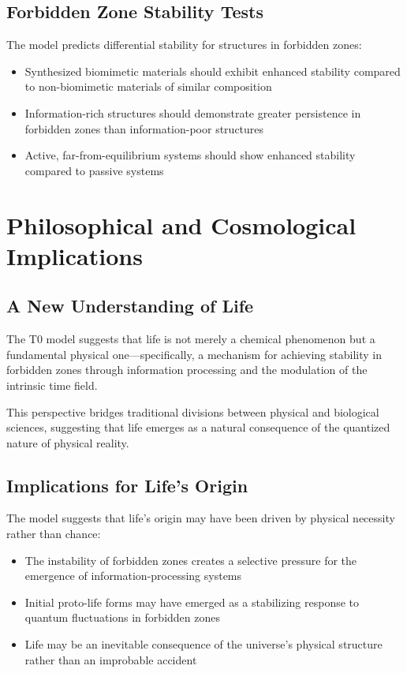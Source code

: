 \documentclass[12pt,a4paper]{article}
\begin{document}
	\subsection{Forbidden Zone Stability Tests}
	\label{subsec:forbidden_zone_tests}
	
	The model predicts differential stability for structures in forbidden zones:
	
	\begin{itemize}
		\item Synthesized biomimetic materials should exhibit enhanced stability compared to non-biomimetic materials of similar composition
		\item Information-rich structures should demonstrate greater persistence in forbidden zones than information-poor structures
		\item Active, far-from-equilibrium systems should show enhanced stability compared to passive systems
	\end{itemize}
	
	\section{Philosophical and Cosmological Implications}
	\label{sec:philosophical_implications}
	
	\subsection{A New Understanding of Life}
	\label{subsec:new_understanding}
	
	The T0 model suggests that life is not merely a chemical phenomenon but a fundamental physical one—specifically, a mechanism for achieving stability in forbidden zones through information processing and the modulation of the intrinsic time field.
	
	This perspective bridges traditional divisions between physical and biological sciences, suggesting that life emerges as a natural consequence of the quantized nature of physical reality.
	
	\subsection{Implications for Life's Origin}
	\label{subsec:origin_implications}
	
	The model suggests that life's origin may have been driven by physical necessity rather than chance:
	
	\begin{itemize}
		\item The instability of forbidden zones creates a selective pressure for the emergence of information-processing systems
		\item Initial proto-life forms may have emerged as a stabilizing response to quantum fluctuations in forbidden zones
		\item Life may be an inevitable consequence of the universe's physical structure rather than an improbable accident
	\end{itemize}
	
\end{document}
